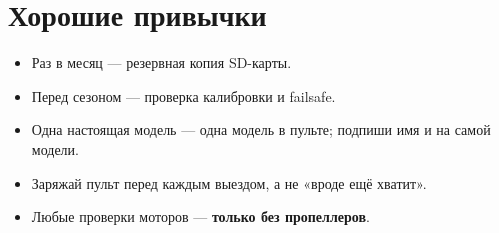 \section{Хорошие привычки}

\begin{itemize}
  \item Раз в месяц --- резервная копия SD-карты.
  \item Перед сезоном --- проверка калибровки и failsafe.
  \item Одна настоящая модель --- одна модель в пульте; подпиши имя и на самой модели.
  \item Заряжай пульт перед каждым выездом, а не «вроде ещё хватит».
  \item Любые проверки моторов --- \textbf{только без пропеллеров}.
\end{itemize}
